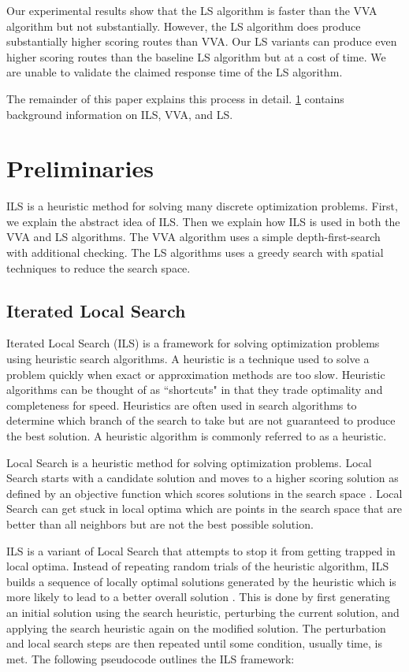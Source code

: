 \documentclass[honors]{union-cs-thesis}
\newcommand{\td}{\todo[inline]}
\begin{document}
Our experimental results show that the LS algorithm is faster than the VVA algorithm but not substantially. However, the LS algorithm does produce substantially higher scoring routes than VVA. Our LS variants can produce even higher scoring routes than the baseline LS algorithm but at a cost of time. We are unable to validate the claimed response time of the LS algorithm.

The remainder of this paper explains this process in detail. \cref{sec:prelim} contains background information on ILS, VVA, and LS.

\td{Edit this as I make new sections??}



\section{Preliminaries}
\label{sec:prelim}
ILS is a heuristic method for solving many discrete optimization problems. First, we explain the abstract idea of ILS. Then we explain how ILS is used in both the VVA and LS algorithms. The VVA algorithm uses a simple depth-first-search with additional checking. The LS algorithms uses a greedy search with spatial techniques to reduce the search space.

\subsection{Iterated Local Search}
Iterated Local Search (ILS) is a framework for solving optimization problems using heuristic search algorithms. A heuristic is a technique used to solve a problem quickly when exact or approximation methods are too slow. Heuristic algorithms can be thought of as ``shortcuts" in that they trade optimality and completeness for speed. Heuristics are often used in search algorithms to  determine which branch of the search to take but are not guaranteed to produce the best solution. A heuristic algorithm is commonly referred to as a heuristic.

Local Search is a heuristic method for solving optimization problems. Local Search starts with a candidate solution and moves to a higher scoring solution as defined by an objective function which scores solutions in the search space \cite{gendreau2010handbook}. Local Search can get stuck in local optima which are points in the search space that are better than all neighbors but are not the best possible solution.

ILS is a variant of Local Search that attempts to stop it from getting trapped in local optima. Instead of repeating random trials of the heuristic algorithm, ILS builds a sequence of locally optimal solutions generated by the heuristic which is more likely to lead to a better overall solution \cite{gendreau2010handbook}. This is done by first generating an initial solution using the search heuristic, perturbing the current solution, and applying the search heuristic again on the modified solution. The perturbation and local search steps are then repeated until some condition, usually time, is met.
The following pseudocode outlines the ILS framework:
\end{document}
